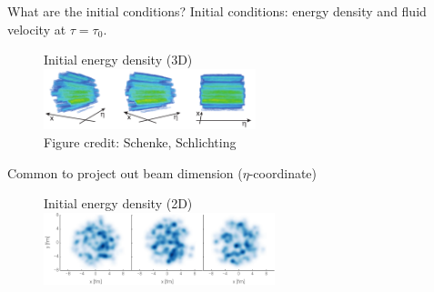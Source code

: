 \documentclass[xcolor=dvipsnames, aspectratio=169]{beamer}
\begin{document}
\begin{frame}[plain]{What are the initial conditions?}
    \vspace{0.6 cm}
    \small Initial conditions: energy density and fluid velocity at $\tau=\tau_0$.
    \begin{figure}
        \scriptsize Initial energy density (3D)\\
        \includegraphics[width=0.55\textwidth]{three_dim}\\
        Figure credit: Schenke, Schlichting
    \end{figure}
    \small Common to project out beam dimension ($\eta$-coordinate)\\
    \begin{figure}
        \scriptsize Initial energy density (2D)\\
        \includegraphics[width=0.6\textwidth]{trento2d}
    \end{figure}
\end{frame}
\end{document}
